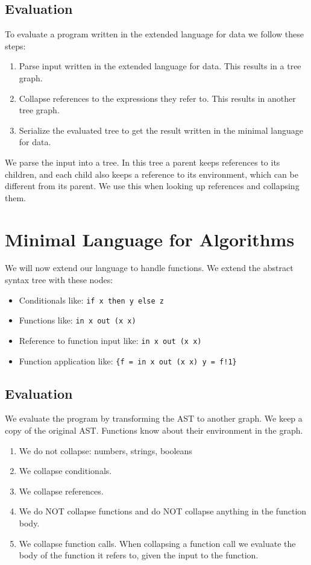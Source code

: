 \documentclass[a4paper,12pt]{article}
\begin{document}
\subsection{Evaluation}

To evaluate a program written in the extended language for data we follow these steps:
\begin{enumerate}
\item Parse input written in the extended language for data. This results in a tree graph.
\item Collapse references to the expressions they refer to. This results in another tree graph.
\item Serialize the evaluated tree to get the result written in the minimal language for data.
\end{enumerate}
We parse the input into a tree. In this tree a parent keeps references to its children, and each child also keeps a reference to its environment, which can be different from its parent. We use this when looking up references and collapsing them.

\section{Minimal Language for Algorithms}

We will now extend our language to handle functions. We extend the abstract syntax tree with these nodes:
\begin{itemize}
\item Conditionals like: \lstinline|if x then y else z|
\item Functions like: \lstinline|in x out (x x)|
\item Reference to function input like: \lstinline|in x out (x x)|
\item Function application like: \lstinline|{f = in x out (x x) y = f!1}|
\end{itemize}

\subsection{Evaluation}

We evaluate the program by transforming the AST to another graph. We keep a copy of the original AST. Functions know about their environment in the graph.
\begin{enumerate}
\item We do not collapse: numbers, strings, booleans
\item We collapse conditionals.
\item We collapse references.
\item We do NOT collapse functions and do NOT collapse anything in the function body.
\item We collapse function calls. When collapsing a function call we evaluate the body of the function it refers to, given the input to the function.
\end{enumerate}
\end{document}
